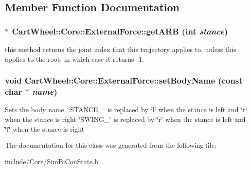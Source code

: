 \subsection{Member Function Documentation}
\hypertarget{classCartWheel_1_1Core_1_1ExternalForce_a9139c9e288b5f8a757611a6b250b695b}{
\subsubsection[{getARB}]{$\ast$ CartWheel::Core::ExternalForce::getARB (int {\em stance})}}
\label{classCartWheel_1_1Core_1_1ExternalForce_a9139c9e288b5f8a757611a6b250b695b}
this method returns the joint index that this trajectory applies to, unless this applies to the root, in which case it returns -\/1. \hypertarget{classCartWheel_1_1Core_1_1ExternalForce_af746d1613c7fff65cb44b1091e9de7fe}{
\subsubsection[{setBodyName}]{\setlength{\rightskip}{0pt plus 5cm}void CartWheel::Core::ExternalForce::setBodyName (const char $\ast$ {\em name})}}
\label{classCartWheel_1_1Core_1_1ExternalForce_af746d1613c7fff65cb44b1091e9de7fe}
Sets the body name. \char`\"{}STANCE\_\-\char`\"{} is replaced by \char`\"{}l\char`\"{} when the stance is left and \char`\"{}r\char`\"{} when the stance is right \char`\"{}SWING\_\-\char`\"{} is replaced by \char`\"{}r\char`\"{} when the stance is left and \char`\"{}l\char`\"{} when the stance is right 

The documentation for this class was generated from the following file:\begin{DoxyCompactItemize}
\item 
include/Core/SimBiConState.h\end{DoxyCompactItemize}
